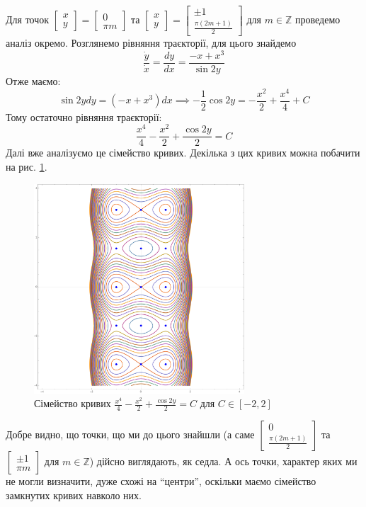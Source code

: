 \documentclass[14pt]{extarticle}
\begin{document}
Для точок $\begin{bmatrix}
    x \\ y
\end{bmatrix} = \begin{bmatrix}
    0 \\ \pi m
\end{bmatrix}$ та $\begin{bmatrix}
    x \\ y
\end{bmatrix} = \begin{bmatrix}
    \pm 1 \\ \frac{\pi(2m+1)}{2}
\end{bmatrix}$ для $m \in \mathbb{Z}$ проведемо аналіз окремо. Розглянемо рівняння траєкторії, для цього знайдемо
\[
\frac{\dot{y}}{\dot{x}} = \frac{dy}{dx} = \frac{-x+x^3}{\sin 2y}
\]
Отже маємо:
\[
\sin 2y dy = (-x+x^3)dx \implies -\frac{1}{2}\cos 2y = -\frac{x^2}{2} + \frac{x^4}{4} + C
\]
Тому остаточно рівняння траєкторії:
\[
\frac{x^4}{4} - \frac{x^2}{2} + \frac{\cos 2y}{2} = C
\]
Далі вже аналізуємо це сімейство кривих. Декілька з цих кривих можна побачити на рис. \ref{fig:1}.
\begin{figure}[H]
    \centering
    \includegraphics[width=0.7\textwidth]{images/test_3/diff_eq.png}
    \caption{Сімейство кривих $\frac{x^4}{4}-\frac{x^2}{2}+\frac{\cos 2y}{2}=C$ для $C \in [-2,2]$}
    \label{fig:1}
\end{figure}

Добре видно, що точки, що ми до цього знайшли (а саме $\begin{bmatrix}
    0 \\ \frac{\pi(2m+1)}{2}
\end{bmatrix}$ та $\begin{bmatrix}
    \pm 1 \\ \pi m
\end{bmatrix}$ для $m \in \mathbb{Z}$) дійсно виглядають, як седла. А ось точки, характер яких ми не могли визначити, дуже схожі на ``центри'', оскільки маємо сімейство замкнутих кривих навколо них. 
\end{document}
